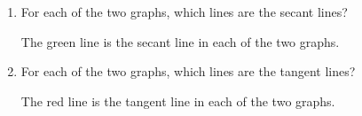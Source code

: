 \documentclass[nooutcomes,handout]{ximera}
\begin{document}
\begin{problem}
\begin{enumerate}
    \item 
      For each of the two graphs, which lines are the secant lines?
      \begin{freeResponse}
        The green line is the secant line in each of the two graphs.        
      \end{freeResponse}

    \item 
      For each of the two graphs, which lines are the tangent lines?
      \begin{freeResponse}
        The red line is the tangent line in each of the two graphs.        
      \end{freeResponse}

  \end{enumerate}
\end{problem}

		
		
\end{document}
